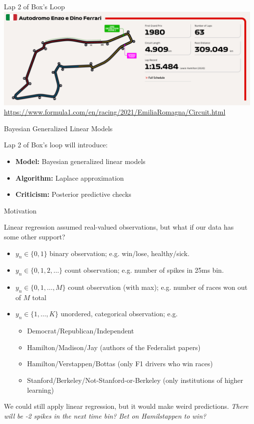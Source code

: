 \documentclass[aspectratio=169]{beamer}
\begin{document}
\begin{frame}{Lap 2 of Box's Loop}
\centering 
\includegraphics[width=.8\linewidth]{figures/lap2/ferrari.png}
{\footnotesize \url{https://www.formula1.com/en/racing/2021/EmiliaRomagna/Circuit.html}}
\end{frame}

\begin{frame}{Bayesian Generalized Linear Models}

Lap 2 of Box's loop will introduce:
\begin{itemize}
    \item \textbf{Model:} Bayesian generalized linear models
    \item \textbf{Algorithm:} Laplace approximation
    \item \textbf{Criticism:} Posterior predictive checks
\end{itemize}

\end{frame}

\begin{frame}{Motivation}

Linear regression assumed real-valued observations, but what if our data has some other support?
\begin{itemize}
    \item $y_n \in \{0, 1\}$ binary observation; e.g. win/lose, healthy/sick.
    \item $y_n \in \{0, 1, 2, \ldots\} $ count observation; e.g. number of spikes in 25ms bin.
    \item $y_n \in \{0, 1, \ldots, M\} $ count observation (with max); e.g. number of races won out of $M$ total
    \item $y_n \in \{1, \ldots, K\}$ unordered, categorical observation; e.g. 
    \begin{itemize}
        \item Democrat/Republican/Independent
        \item Hamilton/Madison/Jay (authors of the Federalist papers)
        \item Hamilton/Verstappen/Bottas (only F1 drivers who win races)
        \item Stanford/Berkeley/Not-Stanford-or-Berkeley (only institutions of higher learning)
    \end{itemize}
\end{itemize}

We could still apply linear regression, but it would make weird predictions. \textit{There will be -2 spikes in the next time bin?} \textit{Bet on Hamilstappen to win?}
\end{frame}
\end{document}
